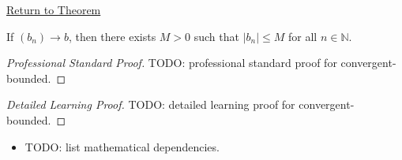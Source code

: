 \newpage
{}
\label{prf:convergent-bounded}

\begin{remark*}[Return]
\hyperref[prop:convergent-bounded]{Return to Theorem}
\end{remark*}

\begin{theorem*}
If $(b_n)\to b$, then there exists $M>0$ such that $|b_n|\leq M$ for all
$n\in\mathbb{N}$.
\end{theorem*}

\begin{proof}[Professional Standard Proof]
\LRAProofBodyStart
TODO: professional standard proof for convergent-bounded.
\end{proof}

\begin{proof}[Detailed Learning Proof]
\LRAProofBodyStart
TODO: detailed learning proof for convergent-bounded.
\end{proof}

\begin{remark*}
\end{remark*}

\begin{dependencies}
\begin{itemize}
  \item TODO: list mathematical dependencies.
\end{itemize}
\end{dependencies}

\clearpage
